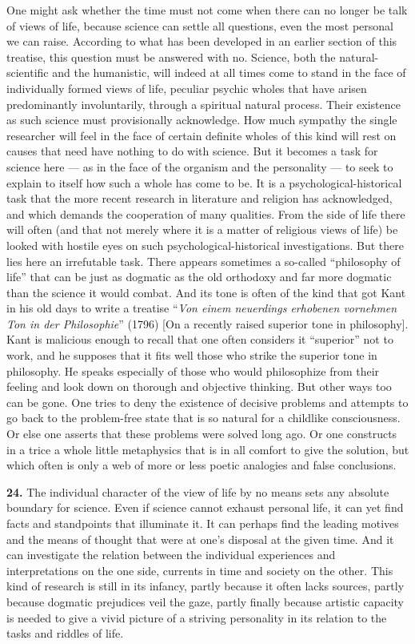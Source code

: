 \documentclass[12pt]{book}
\newcommand{\hnum}[1]{\textbf{#1.}\enspace}
\newcommand{\opage}[1]{\marginnote{\footnotesize\textit{[#1]}}}
\begin{document}
One might ask whether the time must not come when there can no longer be talk of views of life, because science can
settle all questions, even the most personal we can raise. According to what has been developed in an earlier section
of this treatise, this question must be answered with no. Science, both the natural-scientific and the humanistic,
will indeed at all times come to stand in the face of individually formed views of life, peculiar psychic wholes
that have arisen \opage{74}predominantly involuntarily, through a spiritual natural process. Their existence as such science
must provisionally acknowledge. How much sympathy the single researcher will feel in the face of certain definite
wholes of this kind will rest on causes that need have nothing to do with science. But it becomes a task for science
here --- as in the face of the organism and the personality --- to seek to explain to itself how such a whole has
come to be. It is a psychological-historical task that the more recent research in literature and religion has
acknowledged, and which demands the cooperation of many qualities. From the side of life there will often (and that
not merely where it is a matter of religious views of life) be looked with hostile eyes on such
psychological-historical investigations. But there lies here an irrefutable task. There appears sometimes a so-called
``philosophy of life'' that can be just as dogmatic as the old orthodoxy and far more dogmatic than the science it
would combat. And its tone is often of the kind that got Kant in his old days to write a treatise ``\textit{Von einem
neuerdings erhobenen vornehmen Ton in der Philosophie}'' (1796) [On a recently raised superior tone in philosophy].
Kant is malicious enough to recall that one often considers it ``superior'' not to work, and he supposes that it fits
well those who strike the superior tone in philosophy. He speaks especially of those who would philosophize from their
feeling and look down on thorough and objective thinking. But other ways too can be gone. One tries to deny the
existence of decisive problems and attempts to go back to the problem-free state that is so natural for a childlike
consciousness. Or else one asserts that these problems were solved long ago. Or one constructs in a trice a whole
little metaphysics that is in all comfort \opage{75}to give the solution, but which often is only a web of more or less poetic
analogies and false conclusions.

\hnum{24} The individual character of the view of life by no means sets any absolute boundary for science. Even if
science cannot exhaust personal life, it can yet find facts and standpoints that illuminate it. It can perhaps find
the leading motives and the means of thought that were at one's disposal at the given time. And it can investigate
the relation between the individual experiences and interpretations on the one side, currents in time and society on
the other. This kind of research is still in its infancy, partly because it often lacks sources, partly because
dogmatic prejudices veil the gaze, partly finally because artistic capacity is needed to give a vivid picture of a
striving personality in its relation to the tasks and riddles of life.
\end{document}

